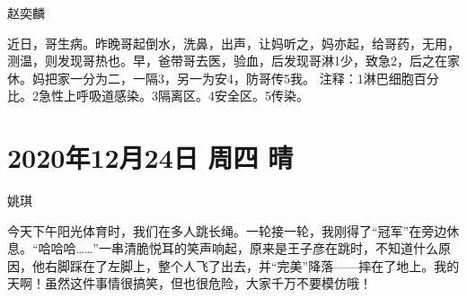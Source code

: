 赵奕麟

近日，哥生病。昨晚哥起倒水，洗鼻，出声，让妈听之，妈亦起，给哥药，无用，测温，则发现哥热也。早，爸带哥去医，验血，后发现哥淋1少，致急2，后之在家休。妈把家一分为二，一隔3，另一为安4，防哥传5我。
注释：1淋巴细胞百分比。2急性上呼吸道感染。3隔离区。4安全区。5传染。

\section{2020年12月24日 周四 晴}

姚琪

今天下午阳光体育时，我们在多人跳长绳。一轮接一轮，我刚得了``冠军''在旁边休息。``哈哈哈\ldots\ldots{}''一串清脆悦耳的笑声响起，原来是王子彦在跳时，不知道什么原因，他右脚踩在了左脚上，整个人飞了出去，并``完美''降落------摔在了地上。我的天啊！虽然这件事情很搞笑，但也很危险，大家千万不要模仿哦！
